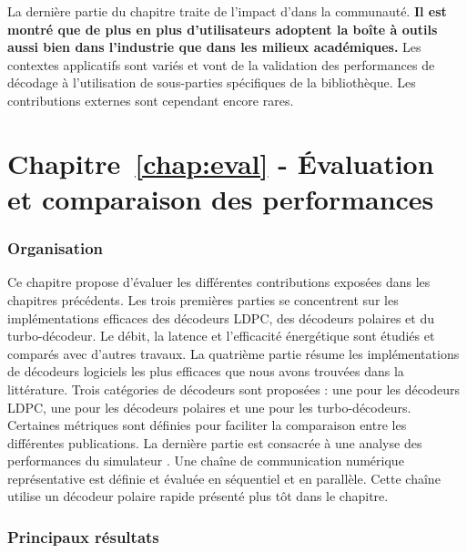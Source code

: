 La dernière partie du chapitre traite de l'impact d'\AFFECT dans la communauté.
\textbf{Il est montré que de plus en plus d'utilisateurs adoptent la boîte à
outils \AFFECT aussi bien dans l'industrie que dans les milieux académiques.}
Les contextes applicatifs sont variés et vont de la validation des performances
de décodage à l'utilisation de sous-parties spécifiques de la bibliothèque. Les
contributions externes sont cependant encore rares.

\section*{Chapitre~\ref{chap:eval} - Évaluation et comparaison des performances}

\subsubsection*{Organisation}

Ce chapitre propose d'évaluer les différentes contributions exposées dans les
chapitres précédents. Les trois premières parties se concentrent sur les
implémentations efficaces des décodeurs LDPC, des décodeurs polaires et du
turbo-décodeur. Le débit, la latence et l'efficacité énergétique sont étudiés
et comparés avec d'autres travaux. La quatrième partie résume les
implémentations de décodeurs logiciels les plus efficaces que nous avons
trouvées dans la littérature. Trois catégories de décodeurs sont proposées : une
pour les décodeurs LDPC, une pour les décodeurs polaires et une pour les
turbo-décodeurs. Certaines métriques sont définies pour faciliter la comparaison
entre les différentes publications. La dernière partie est consacrée à une
analyse des performances du simulateur \AFFECT. Une chaîne de communication
numérique représentative est définie et évaluée en séquentiel et en parallèle.
Cette chaîne utilise un décodeur polaire rapide présenté plus tôt dans le
chapitre.

\subsubsection*{Principaux résultats}

